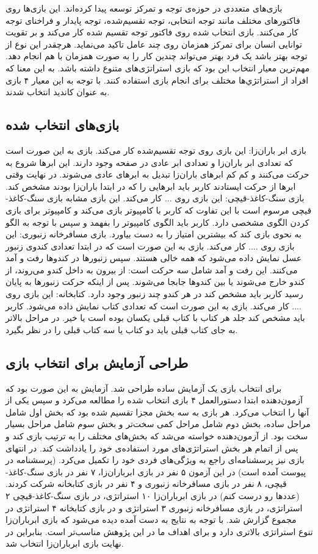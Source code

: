 \documentclass[twoside, a4paper,11pt]{book}
\numberwithin{equation}{chapter}
\numberwithin{table}{chapter}
\numberwithin{figure}{chapter}
\numberwithin{equation}{chapter}
\begin{document}
بازی‌های متعددی در حوزه‌ی توجه و تمرکز توسعه پیدا کرده‌اند. این بازی‌ها روی فاکتورهای مختلف مانند توجه انتخابی، توجه تقسیم‌شده، توجه پایدار و فراخنای توجه کار می‌کنند. بازی انتخاب شده روی فاکتور توجه تقسیم شده کار می‌کند و بر تقویت توانایی انسان برای تمرکز همزمان روی چند عامل تاکید می‌نماید. هرچقدر این نوع از توجه بهتر باشد یک فرد بهتر می‌تواند چندین کار را به صورت همزمان با هم انجام دهد. 
مهم‌ترین معیار انتخاب این بود که بازی استراتژی‌های متنوع داشته باشد. به این معنا که افراد از استراتژي‌ها مختلف برای انجام بازی استفاده کنند. با توجه به این معیار ۴ بازی به عنوان کاندید انتخاب شدند.
\subsection{بازی‌های انتخاب شده}
بازی ابر باران‌زا: این بازی روی توجه تقسیم‌شده کار می‌کند. بازی به این صورت است که تعدادی ابر باران‌زا و تعدادی ابر عادی در صفحه وجود دارند. این ابرها شروع به حرکت می‌کنند و کم کم ابرهای باران‌زا تبدیل به ابرهای عادی می‌شوند. در نهایت وقتی ابرها از حرکت ایستادند کاربر باید ابرهایی را که در ابتدا باران‌زا بودند مشخص کند.
بازی سنگ-کاغذ-قیچی: این بازی روی ... کار می‌کند. این بازی مشابه بازی سنگ-کاغذ-قیچی مرسوم است با این تفاوت که کاربر با کامپیوتر بازی می‌کند و کامپیوتر برای بازی کردن الگوی مشخصی دارد. کاربر باید الگوی کامپیوتر را بفهمد و سپس با توجه به الگو به نحوی بازی کند که بیشترین امتیاز را به دست بیاورد.
بازی مسافرخانه زنبوری: این بازی روی .... کار می‌کند. بازی به این صورت است که در ابتدا تعدادی کندوی زنبور عسل نمایش داده می‌شود که همه خالی هستند. سپس زنبورها در کندوها رفت و آمد می‌کنند. این رفت و آمد شامل سه حرکت است: از بیرون به داخل کندو می‌روند، از کندو خارج می‌شوند یا بین کندوها جابجا می‌شوند. پس از اینکه حرکت زنبورها به پایان رسید کاربر باید مشخص کند در هر کندو چند زنبور وجود دارد.
کتابخانه: این بازی روی .... کار می‌کند. بازی به این صورت است که تعدادی کتاب نمایش داده می‌شود. کاربر باید مشخص کند جلد هر کتاب با کتاب قبلی یکسان بوده است یا خیر. در مراحل بالاتر به جای کتاب قبلی باید دو کتاب یا سه کتاب قبلی را در نظر بگیرد.

\subsection{طراحی آزمایش برای انتخاب بازی}
برای انتخاب بازی یک آزمایش ساده طراحی شد. آزمایش به این صورت بود که آزمون‌دهنده ابتدا دستورالعمل ۴ بازی انتخاب شده را مطالعه می‌کرد و سپس یکی از آنها را انتخاب می‌کرد. هر بازی به سه بخش مجزا تقسیم شده بود که بخش اول شامل مراحل ساده، بخش دوم شامل مراحل کمی سخت‌تر و بخش سوم شامل مراحل بسیار سخت بود. از آزمون‌دهنده خواسته می‌شد که بخش‌های مختلف را به ترتیب بازی کند و پس از اتمام هر بخش استراتژی‌های مورد استفاده‌ی خود را یادداشت کند. در انتهای بازی نیز پرسشنامه‌ای راجع به ویژگی‌های فردی خود را تکمیل می‌کرد. (پرسشنامه در پیوست آمده است)
در این آزمون ۵ نفر در بازی ابرباران‌زا، ۷ نفر در بازی سنگ-کاغذ-قیچی، ۸ نفر در بازی مسافرخانه زنبوری و ۴ نفر در بازی کتابخانه شرکت کردند. (عددها رو درست کنم) در بازی ابرباران‌زا ۱۰ استراتژی، در بازی سنگ-کاغذ-قیچی ۲ استراتژی، در بازی مسافرخانه زنبوری ۳ استراتژی و در بازی کتابخانه ۴ استراتژی در مجموع گزارش شد. با توجه به نتایج به دست آمده دیده می‌شود که بازی ابرباران‌زا تنوع استراتژی بالاتری دارد و برای اهداف ما در این پژوهش مناسب‌تر است. بنابراین در نهایت بازی ابرباران‌زا انتخاب شد.
\end{document}
